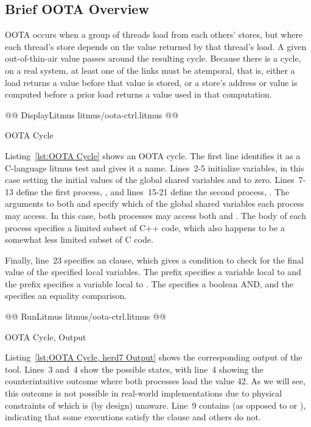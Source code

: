 \documentclass[10]{article}
\begin{document}
\subsection{Brief OOTA Overview}
\label{sec:Brief OOTA Overview}

OOTA occurs when a group of threads load from each others' stores,
but where each thread's store depends on the value returned by that
thread's load.
A given out-of-thin-air value passes around the resulting cycle.
Because there is a cycle, on a real system, at least one of the links
must be atemporal, that is, either a load returns a value before
that value is stored, or a store's address or value is computed before
a prior load returns a value used in that computation.

\begin{listing}[tbp]
@@ DisplayLitmus litmus/oota-ctrl.litmus @@
\caption{OOTA Cycle}
\label{lst:OOTA Cycle}
\end{listing}

Listing~\ref{lst:OOTA Cycle}
shows an OOTA cycle.
The first line identifies it as a C-language litmus test and gives it
a name.
Lines~2-5 initialize variables, in this case setting the initial
values of the global shared variables  and  to zero.
Lines~7-13 define the first process, , and lines~15-21
define the second process, .
The arguments to both  and  specify which of
the global shared variables each process may access.
In this case, both processes may access both  and .
The body of each process specifies a limited subset of C++ code,
which also happens to be a somewhat less limited subset of C code.

Finally, line~23 specifies an  clause, which gives a
condition to check for the final value of the specified local
variables.
The  prefix specifies a variable local to  and
the  prefix specifies a variable local to .
The \co{/\\} specifies a boolean AND, and the \co{=} specifies
an equality comparison.

\begin{listing}[tbp]
@@ RunLitmus litmus/oota-ctrl.litmus @@
\caption{OOTA Cycle,  Output}
\label{lst:OOTA Cycle, herd7 Output}
\end{listing}

Listing~\ref{lst:OOTA Cycle, herd7 Output} shows the corresponding output
of the  tool.
Lines~3 and~4 show the possible states, with line~4 showing the
counterintuitive outcome where both processes load the value 42.
As we will see, this outcome is not possible in real-world implementations
due to physical constraints of which  is (by design) unaware.
Line~9 contains  (as opposed to  or ),
indicating that some executions satisfy the  clause and
others do not.
\end{document}
